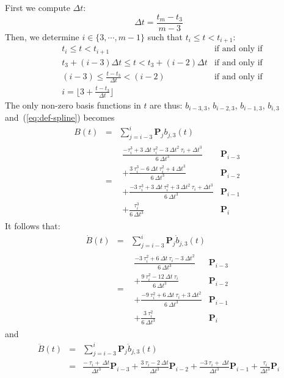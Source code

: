 \documentclass{article}
\begin{document}
First we compute $\Delta t$:
$$
\Delta t = \frac{t_m - t_3}{m-3}
$$
Then, we determine $i\in\{3,\cdots,m-1\}$ such that $t_i \leq t < t_{i+1}$:
\begin{eqnarray*}
&t_i \leq t < t_{i+1} & \mbox{if and only if} \\
&t_3+(i-3)\Delta t \leq t < t_3+(i-2)\Delta t & \mbox{if and only if}\\
&(i-3) \leq \frac{t-t_3}{\Delta t} < (i-2) & \mbox{if and only if}\\
& i = \lfloor 3+\frac{t-t_3}{\Delta t} \rfloor
\end{eqnarray*}
The only non-zero basis functions in $t$ are thus: $b_{i-3,3}$, $b_{i-2,3}$, $b_{i-1,3}$, $b_{i,3}$ and~(\ref{eq:def-spline}) becomes
\begin{eqnarray*}
  B(t) &=& \sum_{j=i-3}^{i} \textbf{P}_j b_{j,3}(t) \\
&=& \begin{array}{ll}\frac{-\tau_{i}^3 + 3\ \Delta t\ \tau_{i}^2 - 3\ \Delta t^2\ \tau_{i} + \Delta t^3 }{6\ \Delta t^3} & \textbf{P}_{i-3} \\
+ \frac{3\ \tau_{i}^3-6\ \Delta t\ \tau_{i}^2 + 4\ \Delta t^3}{6\ \Delta t^3} & \textbf{P}_{i-2} \\
+ \frac{-3\ \tau_{i}^3 + 3\ \Delta t\ \tau_{i}^2 + 3\ \Delta t^2\ \tau_{i}+\Delta t^3}{6\ \Delta t^3} & \textbf{P}_{i-1}\\
+ \frac{\tau_i^3}{6\ \Delta t^3} & \textbf{P}_{i} \end{array}
\end{eqnarray*}
It follows that:
\begin{eqnarray*}
  \dot{B}(t) &=& \sum_{j=i-3}^{i} \textbf{P}_j \dot{b}_{j,3}(t) \\
&=& \begin{array}{ll}\frac{-3\ \tau_{i}^2 + 6\ \Delta t\ \tau_{i} - 3\ \Delta t^2}{6\ \Delta t^3} & \textbf{P}_{i-3} \\
+ \frac{9\ \tau_{i}^2-12\ \Delta t\ \tau_{i}}{6\ \Delta t^3} & \textbf{P}_{i-2} \\
+ \frac{-9\ \tau_{i}^2 + 6\ \Delta t\ \tau_{i} + 3\ \Delta t^2}{6\ \Delta t^3} & \textbf{P}_{i-1}\\
+ \frac{3\ \tau_i^2}{6\ \Delta t^3} & \textbf{P}_{i} \end{array}
\end{eqnarray*}
and
\begin{eqnarray*}
  \ddot{B}(t) &=& \sum_{j=i-3}^{i} \textbf{P}_j \ddot{b}_{j,3}(t) \\
&=& \frac{-\ \tau_{i} + \ \Delta t}{\Delta t^3} \textbf{P}_{i-3} 
+ \frac{3\ \tau_{i}-2\ \Delta t}{\Delta t^3} \textbf{P}_{i-2}
+ \frac{-3\ \tau_{i} + \ \Delta t}{\Delta t^3} \textbf{P}_{i-1}
+ \frac{\tau_i}{\Delta t^3} \textbf{P}_{i}
\end{eqnarray*}
\end{document}
